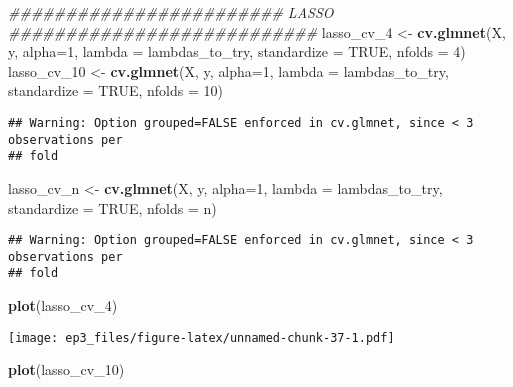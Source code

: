 \documentclass[]{article}
\newenvironment{Shaded}{\begin{snugshade}}{\end{snugshade}}
\newcommand{\CommentTok}[1]{\textcolor[rgb]{0.56,0.35,0.01}{\textit{#1}}}
\newcommand{\DataTypeTok}[1]{\textcolor[rgb]{0.13,0.29,0.53}{#1}}
\newcommand{\DecValTok}[1]{\textcolor[rgb]{0.00,0.00,0.81}{#1}}
\newcommand{\KeywordTok}[1]{\textcolor[rgb]{0.13,0.29,0.53}{\textbf{#1}}}
\newcommand{\NormalTok}[1]{#1}
\newcommand{\OtherTok}[1]{\textcolor[rgb]{0.56,0.35,0.01}{#1}}
\newcommand{\StringTok}[1]{\textcolor[rgb]{0.31,0.60,0.02}{#1}}
\begin{document}
\begin{Shaded}
\begin{Highlighting}[]
\CommentTok{######################## LASSO ###########################}
\NormalTok{lasso_cv_}\DecValTok{4}\NormalTok{ <-}\StringTok{ }\KeywordTok{cv.glmnet}\NormalTok{(X, y, }\DataTypeTok{alpha=}\DecValTok{1}\NormalTok{, }\DataTypeTok{lambda =}\NormalTok{ lambdas_to_try, }\DataTypeTok{standardize =} \OtherTok{TRUE}\NormalTok{, }\DataTypeTok{nfolds =} \DecValTok{4}\NormalTok{)}
\NormalTok{lasso_cv_}\DecValTok{10}\NormalTok{ <-}\StringTok{ }\KeywordTok{cv.glmnet}\NormalTok{(X, y, }\DataTypeTok{alpha=}\DecValTok{1}\NormalTok{, }\DataTypeTok{lambda =}\NormalTok{ lambdas_to_try, }\DataTypeTok{standardize =} \OtherTok{TRUE}\NormalTok{, }\DataTypeTok{nfolds =} \DecValTok{10}\NormalTok{)}
\end{Highlighting}
\end{Shaded}

\begin{verbatim}
## Warning: Option grouped=FALSE enforced in cv.glmnet, since < 3 observations per
## fold
\end{verbatim}

\begin{Shaded}
\begin{Highlighting}[]
\NormalTok{lasso_cv_n <-}\StringTok{ }\KeywordTok{cv.glmnet}\NormalTok{(X, y, }\DataTypeTok{alpha=}\DecValTok{1}\NormalTok{, }\DataTypeTok{lambda =}\NormalTok{ lambdas_to_try, }\DataTypeTok{standardize =} \OtherTok{TRUE}\NormalTok{, }\DataTypeTok{nfolds =}\NormalTok{ n)}
\end{Highlighting}
\end{Shaded}

\begin{verbatim}
## Warning: Option grouped=FALSE enforced in cv.glmnet, since < 3 observations per
## fold
\end{verbatim}

\begin{Shaded}
\begin{Highlighting}[]
\KeywordTok{plot}\NormalTok{(lasso_cv_}\DecValTok{4}\NormalTok{)}
\end{Highlighting}
\end{Shaded}

\texttt{[image: ep3\_files/figure-latex/unnamed-chunk-37-1.pdf]}

\begin{Shaded}
\begin{Highlighting}[]
\KeywordTok{plot}\NormalTok{(lasso_cv_}\DecValTok{10}\NormalTok{)}
\end{Highlighting}
\end{Shaded}
\end{document}
